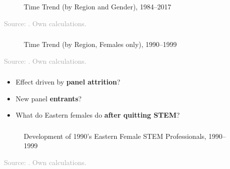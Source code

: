 \documentclass[11pt, aspectratio=1610, xcolor={dvipsnames}]{beamer}
\newcommand{\highlight}[1]{\textbf{\textcolor{PineGreen}{#1}}}
\begin{document}
	\begin{frame}
		\frametitle{}
		
		\hypertarget{graph}{}
		
		\begin{figure}[h]
			\centering
			\caption{Time Trend (by Region and Gender), 1984--2017}
			\label{fig:trend_highlight}
			\resizebox{75mm}{!}{}
		\end{figure}
		
		{\scriptsize
			\textcolor{darkgray}{Source: \cite{SOEP2023}. Own calculations.}
		}
		
	\end{frame}
	
	\begin{frame}
		\frametitle{}
		
		\begin{figure}[h]
			\centering
			\caption{Time Trend (by Region, Females only), 1990--1999}
			\label{fig:trend_zoomed}
			\resizebox{75mm}{!}{}
		\end{figure}
		
		{\scriptsize
			\textcolor{darkgray}{Source: \cite{SOEP2023}. Own calculations.}
		}
		
	\end{frame}
	
	\begin{frame}
		\frametitle{}
		
		\begin{itemize}
			\item Effect driven by \highlight{panel attrition}?
			\item New panel \highlight{entrants}?
			\item What do Eastern females do \highlight{after quitting STEM}?
		\end{itemize}
		
	\end{frame}
	
	\begin{frame}
		\frametitle{}
		
		\begin{figure}[h]
			\centering
			\caption{Development of 1990's Eastern Female STEM Professionals, 1990--1999}
			\label{fig:survival}
			\resizebox{75mm}{!}{}
		\end{figure}
		
		{\scriptsize
			\textcolor{darkgray}{Source: \cite{SOEP2023}. Own calculations.}
		}
		
	\end{frame}
	
\end{document}
